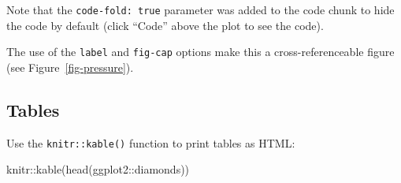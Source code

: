 \documentclass[
  a4paper,
]{article}
\newenvironment{Shaded}{\begin{snugshade}}{\end{snugshade}}
\newcommand{\FunctionTok}[1]{\textcolor[rgb]{0.28,0.35,0.67}{#1}}
\newcommand{\NormalTok}[1]{\textcolor[rgb]{0.00,0.23,0.31}{#1}}
\newcommand{\SpecialCharTok}[1]{\textcolor[rgb]{0.37,0.37,0.37}{#1}}
\begin{document}
Note that the \texttt{code-fold:\ true} parameter was added to the code
chunk to hide the code by default (click ``Code'' above the plot to see
the code).

The use of the \texttt{label} and \texttt{fig-cap} options make this a
cross-referenceable figure (see Figure~\ref{fig-pressure}).

\subsection{Tables}\label{tables}

Use the \texttt{knitr::kable()} function to print tables as HTML:

\begin{Shaded}
\begin{Highlighting}[]
\NormalTok{knitr}\SpecialCharTok{::}\FunctionTok{kable}\NormalTok{(}\FunctionTok{head}\NormalTok{(ggplot2}\SpecialCharTok{::}\NormalTok{diamonds))}
\end{Highlighting}
\end{Shaded}
\end{document}
